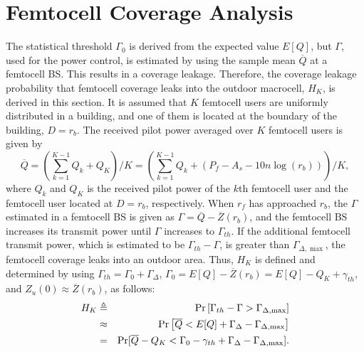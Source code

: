 \documentclass[draftclsnofoot,12pt,onecolumn]{IEEEtran}
\begin{document}
\section{Femtocell Coverage Analysis}
\label{sec:coverage} The statistical threshold $\Gamma_0$ is derived
from the expected value $E\left[Q\right]$, but $\Gamma$, used for
the power control, is estimated by using the sample mean
$\overline{Q}$ at a femtocell BS. This results in a coverage
leakage. Therefore, the coverage leakage probability that femtocell
coverage leaks into the outdoor macrocell, $H_K$, is derived in this
section. It is assumed that $K$ femtocell users are uniformly
distributed in a building, and one of them is located at the
boundary of the building, $D=r_b$.
The received pilot power averaged over $K$ femtocell users is given
by
\begin{equation}
\overline{Q}=\left(\textstyle{\sum_{k=1}^{K-1}}Q_k+Q_K
\right)\Big/K=\left(\textstyle{\sum_{k=1}^{K-1}}Q_k+(P_f-A_s-10n\log(r_b))
\right)\Big/K,\label{eq:Def_M_N}
\end{equation}
where $Q_k$ and $Q_K$ is the received pilot power of the $k$th
femtocell user and the femtocell user located at $D=r_b$,
respectively. When $r_f$ has approached $r_b$, the $\Gamma$
estimated in a femtocell BS is given as
$\Gamma=\overline{Q}-\overline{Z}(r_b)$, and the femtocell BS
increases its transmit power until $\Gamma$ increases to
$\Gamma_{th}$. If the additional femtocell transmit power, which is
estimated to be $\Gamma_{th}-\Gamma$, is greater than
$\Gamma_{\Delta,\max}$, the femtocell coverage leaks into an outdoor
area. Thus, $H_K$ is defined and determined by using
$\Gamma_{th}=\Gamma_{0}+\Gamma_{\Delta}$, $\Gamma_{0}=
E[Q]-\overline{Z}(r_b)=E[Q]-Q_K+\gamma_{th}$, and
$Z_u(0)\approx\overline{Z}(r_b)$, as follows:
\begin{eqnarray}
H_K&\triangleq&\mathrm{Pr}\left[\Gamma_{th}-\Gamma >
\Gamma_{\Delta,\max}\right]\cr
&\approx&
\mathrm{Pr}\left[\overline{Q}<E[Q]+\Gamma_{\Delta}-\Gamma_{\Delta,\max}\right]\cr
&=& \mathrm{Pr}[\overline{Q}-Q_K<
\Gamma_0-\gamma_{th}+\Gamma_{\Delta}-\Gamma_{\Delta,\max}].\label{eq:Def_H}
\end{eqnarray}
\end{document}

